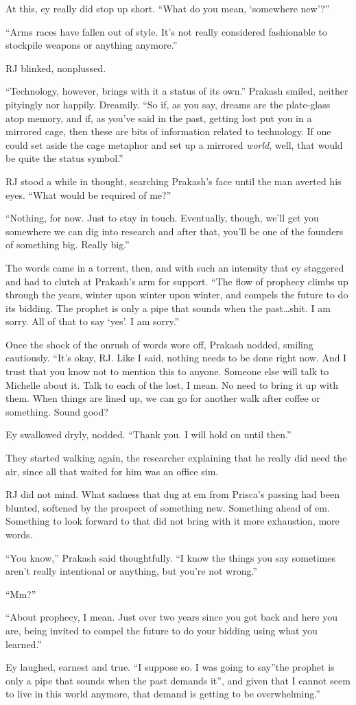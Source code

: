 At this, ey really did stop up short. ``What do you mean, `somewhere new'?''

``Arms races have fallen out of style. It's not really considered fashionable to stockpile weapons or anything anymore.''

RJ blinked, nonplussed.

``Technology, however, brings with it a status of its own.'' Prakash smiled, neither pityingly nor happily. Dreamily. ``So if, as you say, dreams are the plate-glass atop memory, and if, as you've said in the past, getting lost put you in a mirrored cage, then these are bits of information related to technology. If one could set aside the cage metaphor and set up a mirrored \emph{world}, well, that would be quite the status symbol.''

RJ stood a while in thought, searching Prakash's face until the man averted his eyes. ``What would be required of me?''

``Nothing, for now. Just to stay in touch. Eventually, though, we'll get you somewhere we can dig into research and after that, you'll be one of the founders of something big. Really big.''

The words came in a torrent, then, and with such an intensity that ey staggered and had to clutch at Prakash's arm for support. ``The flow of prophecy climbs up through the years, winter upon winter upon winter, and compels the future to do its bidding. The prophet is only a pipe that sounds when the past\ldots shit. I am sorry. All of that to say `yes'. I am sorry.''

Once the shock of the onrush of words wore off, Prakash nodded, smiling cautiously. ``It's okay, RJ. Like I said, nothing needs to be done right now. And I trust that you know not to mention this to anyone. Someone else will talk to Michelle about it. Talk to each of the lost, I mean. No need to bring it up with them. When things are lined up, we can go for another walk after coffee or something. Sound good?

Ey swallowed dryly, nodded. ``Thank you. I will hold on until then.''

They started walking again, the researcher explaining that he really did need the air, since all that waited for him was an office sim.

RJ did not mind. What sadness that dug at em from Prisca's passing had been blunted, softened by the prospect of something new. Something ahead of em. Something to look forward to that did not bring with it more exhaustion, more words.

``You know,'' Prakash said thoughtfully. ``I know the things you say sometimes aren't really intentional or anything, but you're not wrong.''

``Mm?''

``About prophecy, I mean. Just over two years since you got back and here you are, being invited to compel the future to do your bidding using what you learned.''

Ey laughed, earnest and true. ``I suppose so. I was going to say''the prophet is only a pipe that sounds when the past demands it'', and given that I cannot seem to live in this world anymore, that demand is getting to be overwhelming.''
